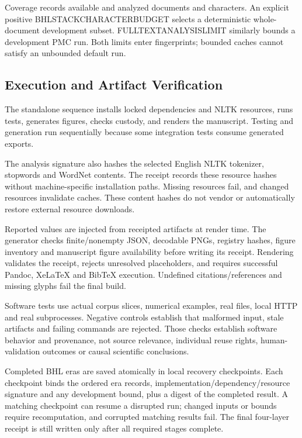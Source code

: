 \documentclass[
]{article}
\newcounter{none} %
\numberwithin{equation}{section}
\DeclareRobustCommand{\codeunderscore}{\textunderscore\allowbreak}
\renewcommand{\texttt}[1]{%
    {\color{codefg}\ttfamily\let\_\codeunderscore #1}%
}
\begin{document}
Coverage records available and analyzed documents and characters. An
explicit positive \texttt{BHL\_STACK\_CHARACTER\_BUDGET} selects a
deterministic whole-document development subset.
\texttt{FULLTEXT\_ANALYSIS\_LIMIT} similarly bounds a development PMC
run. Both limits enter fingerprints; bounded caches cannot satisfy an
unbounded default run.

\subsection{Execution and Artifact
Verification}\label{execution-and-artifact-verification}

The standalone sequence installs locked dependencies and NLTK resources,
runs tests, generates figures, checks custody, and renders the
manuscript. Testing and generation run sequentially because some
integration tests consume generated exports.

The analysis signature also hashes the selected English NLTK tokenizer,
stopwords and WordNet contents. The receipt records these resource
hashes without machine-specific installation paths. Missing resources
fail, and changed resources invalidate caches. These content hashes do
not vendor or automatically restore external resource downloads.

Reported values are injected from receipted artifacts at render time.
The generator checks finite/nonempty JSON, decodable PNGs, registry
hashes, figure inventory and manuscript figure availability before
writing its receipt. Rendering validates the receipt, rejects unresolved
placeholders, and requires successful Pandoc, XeLaTeX and BibTeX
execution. Undefined citations/references and missing glyphs fail the
final build.

Software tests use actual corpus slices, numerical examples, real files,
local HTTP and real subprocesses. Negative controls establish that
malformed input, stale artifacts and failing commands are rejected.
Those checks establish software behavior and provenance, not source
relevance, individual reuse rights, human-validation outcomes or causal
scientific conclusions.

Completed BHL eras are saved atomically in local recovery checkpoints.
Each checkpoint binds the ordered era records,
implementation/dependency/resource signature and any development bound,
plus a digest of the completed result. A matching checkpoint can resume
a disrupted run; changed inputs or bounds require recomputation, and
corrupted matching results fail. The final four-layer receipt is still
written only after all required stages complete.
\end{document}
